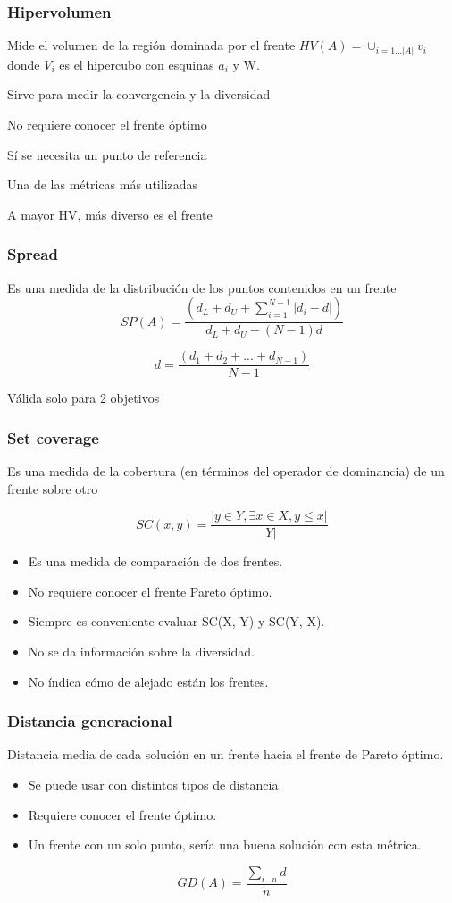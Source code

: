 \documentclass[12pt, twoside, openright]{report} %
\begin{document}
\subsubsection{Hipervolumen}
Mide el volumen de la región dominada por el frente $HV(A) = \cup_{i=1...|A|}v_i$ donde $V_i$ es el hipercubo con esquinas $a_i$ y W.

Sirve para medir la convergencia y la diversidad

No requiere conocer el frente óptimo

Sí se necesita un punto de referencia

Una de las métricas más utilizadas

A mayor HV, más diverso es el frente

\subsubsection{Spread}
Es una medida de la distribución de los puntos contenidos en un frente
$$SP(A) = \frac{(d_L + d_U + \sum_{i=1}^{N-1}|d_i - d|)}{d_L + d_U + (N - 1)d}$$

$$d = \frac{(d_1 + d_2 + ... + d_{N-1})}{N - 1}$$

Válida solo para 2 objetivos
\pagebreak
\subsubsection{Set coverage}
Es una medida de la cobertura (en términos del operador de dominancia) de un frente sobre otro

$$SC(x, y) =\frac{|y \in Y, \exists x \in X, y \leq x|}{|Y|}$$

\begin{itemize}
	\item Es una medida de comparación de dos frentes.
	\item No requiere conocer el frente Pareto óptimo.
	\item Siempre es conveniente evaluar SC(X, Y) y SC(Y, X).
	\item No se da información sobre la diversidad.
	\item No índica cómo de alejado están los frentes.
\end{itemize}

\subsubsection{Distancia generacional}
Distancia media de cada solución en un frente hacia el frente de Pareto óptimo.
\begin{itemize}
	\item Se puede usar con distintos tipos de distancia.
	\item Requiere conocer el frente óptimo.
	\item Un frente con un solo punto, sería una buena solución con esta métrica.
\end{itemize}
$$GD(A)=\frac{\sum_{i...n}d}{n}$$
\end{document}
